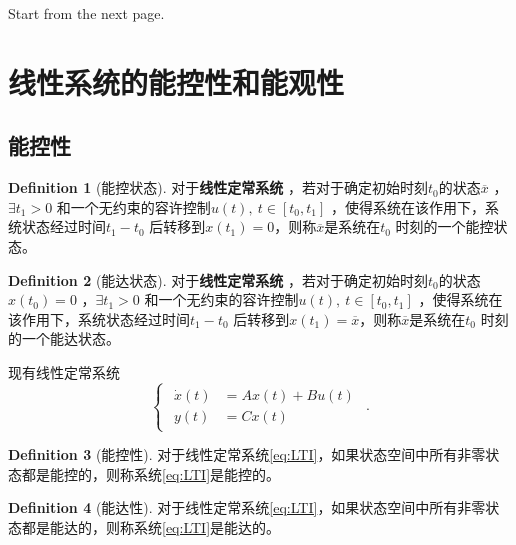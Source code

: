 \documentclass[14pt,a4paper]{article}
\theoremstyle{plain}
\theoremstyle{definition}
\newtheorem*{dfn}{Definition}
\theoremstyle{remark}
\theoremstyle{plain}
\theoremstyle{plain}
\theoremstyle{plain}
\theoremstyle{definition}
\theoremstyle{remark}
\numberwithin{equation}{section}
\begin{document}
        Start from the next page. 
        

	\newpage
	\section{线性系统的能控性和能观性}%
	\label{sec:线性系统的能控性和能观性}
	
		\subsection{能控性}%
		\label{sub:能控性}
		
			\begin{dfn}[能控状态]  
			\label{dfn:能控状态}
			对于\textbf{线性定常系统} ，若对于确定初始时刻$t_0$的状态$\overline{x}$ ，$\exists t_1>0$ 和一个无约束的容许控制$u(t),\ t\in\left[ t_0,t_1 \right]$ ，使得系统在该作用下，系统状态经过时间$t_1-t_0$ 后转移到$x(t_1)=0$，则称$\overline{x}$是系统在$t_0$ 时刻的一个能控状态。
			\end{dfn} 

			\begin{dfn}[能达状态]  
			\label{dfn:能达状态}
			对于\textbf{线性定常系统} ，若对于确定初始时刻$t_0$的状态$x(t_0)=0$ ，$\exists t_1>0$ 和一个无约束的容许控制$u(t),\ t\in\left[ t_0,t_1 \right]$ ，使得系统在该作用下，系统状态经过时间$t_1-t_0$ 后转移到$x(t_1)=\overline{x}$，则称$\overline{x}$是系统在$t_0$ 时刻的一个能达状态。
			\end{dfn} 

			现有线性定常系统
			\begin{equation}
			\label{eq:LTI}
			\begin{cases}
				\begin{aligned}
					\dot x(t) &= Ax(t) + Bu(t) \\ 
					y(t) &= Cx(t)
				\end{aligned}  
			\end{cases} 
			.\end{equation} 

			\begin{dfn}[能控性]  
			\label{dfn:能控性}
				对于线性定常系统\eqref{eq:LTI}，如果状态空间中所有非零状态都是能控的，则称系统\eqref{eq:LTI}是能控的。	
			\end{dfn} 

			\begin{dfn}[能达性]  
			\label{dfn:能达性}
				对于线性定常系统\eqref{eq:LTI}，如果状态空间中所有非零状态都是能达的，则称系统\eqref{eq:LTI}是能达的。	
			\end{dfn} 
\end{document}
